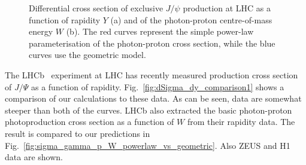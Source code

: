 \documentclass[12pt]{article}
\begin{document}
\begin{figure}[!t]
  \centering
  \caption{Differential cross section of exclusive $J/\psi$ production at LHC as a function of rapidity $Y$ (a) and of the photon-proton centre-of-mass energy $W$ (b).
           The red curves represent the simple power-law parameterisation of the photon-proton cross section, while the blue curves use the geometric model.}
\end{figure}

The LHCb~\cite{LHCb1, LHCb2} experiment at LHC has recently measured production cross section of $J/\Psi$ as a function of rapidity.
Fig.~\ref{fig:dSigma_dy_comparison1} shows a comparison of our calculations to these data.
As can be seen, data are somewhat steeper than both of the curves.
LHCb also extracted the basic photon-proton photoproduction cross section as a function of $W$ from their rapidity data.
The result is compared to our predictions in  Fig.~\ref{fig:sigma_gamma_p_W_powerlaw_vs_geometric}.
Also ZEUS and H1 data are shown.
\end{document}
